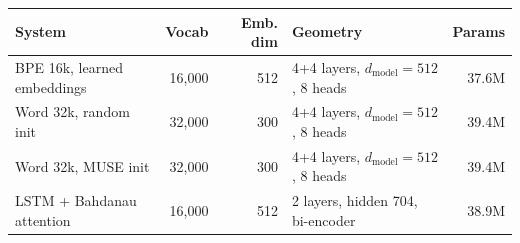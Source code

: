 \begin{tabular}{lrrlr}
\toprule
System & Vocab & Emb. dim & Geometry & Params \\
\midrule
BPE 16k, learned embeddings & 16,000 & 512 & 4+4 layers, $d_{\mathrm{model}}=512$, 8 heads & 37.6M \\
Word 32k, random init & 32,000 & 300 & 4+4 layers, $d_{\mathrm{model}}=512$, 8 heads & 39.4M \\
Word 32k, MUSE init & 32,000 & 300 & 4+4 layers, $d_{\mathrm{model}}=512$, 8 heads & 39.4M \\
LSTM + Bahdanau attention & 16,000 & 512 & 2 layers, hidden 704, bi-encoder & 38.9M \\
\bottomrule
\end{tabular}

